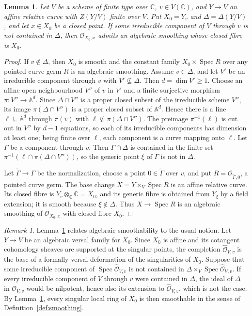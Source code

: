 \documentclass{amsart}
\newtheorem{lemma}[theorem]{Lemma}
\theoremstyle{definition}
\theoremstyle{remark}
\newtheorem{remark}[theorem]{Remark}
\numberwithin{equation}{section}
\newcommand{\C}{\mathbb{C}}
\newcommand{\A}{\mathbb{A}}
\DeclareMathOperator{\Spec}{Spec}
\begin{document}
\begin{lemma}\label{lem:arc}
Let $V$ be a scheme of finite type over $\C$, $v\in V(\C)$, and $Y\to V$ an affine relative curve with $Z(Y/V)$ finite over $V$. Put $X_0=Y_v$ and $\Delta=\Delta(Y/V)$, and let $x\in X_0$ be a closed point. If some irreducible component of $V$ through $v$ is not contained in $\Delta$, then $\mathcal O_{X_0,x}$ admits an algebraic smoothing whose closed fibre is $X_0$.
\end{lemma}

\begin{proof}
If $v\notin\Delta$, then $X_0$ is smooth and the constant family $X_0\times\Spec R$ over any pointed curve germ $R$ is an algebraic smoothing. Assume $v\in\Delta$, and let $V'$ be an irreducible component through $v$ with $V'\not\subseteq\Delta$. Then $d=\dim V'\ge1$. Choose an affine open neighbourhood $V''$ of $v$ in $V'$ and a finite surjective morphism $\pi\colon V''\to\A^d$. Since $\Delta\cap V''$ is a proper closed subset of the irreducible scheme $V''$, its image $\pi(\Delta\cap V'')$ is a proper closed subset of $\A^d$. Hence there is a line $\ell\subseteq\A^d$ through $\pi(v)$ with $\ell\not\subseteq\pi(\Delta\cap V'')$. The preimage $\pi^{-1}(\ell)$ is cut out in $V''$ by $d-1$ equations, so each of its irreducible components has dimension at least one; being finite over $\ell$, each component is a curve mapping onto $\ell$. Let $\Gamma$ be a component through $v$. Then $\Gamma\cap\Delta$ is contained in the finite set $\pi^{-1}(\ell\cap\pi(\Delta\cap V''))$, so the generic point $\xi$ of $\Gamma$ is not in $\Delta$.

Let $\tilde\Gamma\to\Gamma$ be the normalization, choose a point $0\in\tilde\Gamma$ over $v$, and put $R=\mathcal O_{\tilde\Gamma,0}$, a pointed curve germ. The base change $X=Y\times_V\Spec R$ is an affine relative curve. Its closed fibre is $Y_v\otimes_{\C}\C=X_0$, and its generic fibre is obtained from $Y_\xi$ by a field extension; it is smooth because $\xi\notin\Delta$. Thus $X\to\Spec R$ is an algebraic smoothing of $\mathcal O_{X_0,x}$ with closed fibre $X_0$.
\end{proof}

\begin{remark}\label{rem:formal}
Lemma~\ref{lem:arc} relates algebraic smoothability to the usual notion. Let $Y\to V$ be an algebraic versal family for $X_0$. Since $X_0$ is affine and its cotangent cohomology sheaves are supported at the singular points, the completion $\hat{\mathcal O}_{V,v}$ is the base of a formally versal deformation of the singularities of $X_0$. Suppose that some irreducible component of $\Spec\hat{\mathcal O}_{V,v}$ is not contained in $\Delta\times_V\Spec\hat{\mathcal O}_{V,v}$. If every irreducible component of $V$ through $v$ were contained in $\Delta$, the ideal of $\Delta$ in $\mathcal O_{V,v}$ would be nilpotent, hence also its extension to $\hat{\mathcal O}_{V,v}$, which is not the case. By Lemma~\ref{lem:arc}, every singular local ring of $X_0$ is then smoothable in the sense of Definition~\ref{def:smoothing}.
\end{remark}
\end{document}
